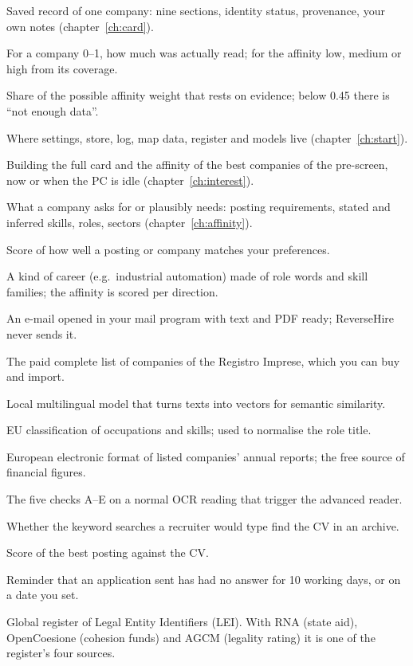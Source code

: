\begin{description}[style=unboxed, leftmargin=1.2em, itemsep=2pt, font=\normalfont\bfseries\color{othDark}]
\item[Company card] Saved record of one company: nine sections, identity status, provenance, your own notes (chapter~\ref{ch:card}).
\item[Confidence] For a company 0--1, how much was actually read; for the affinity low, medium or high from its coverage.
\item[Coverage] Share of the possible affinity weight that rests on evidence; below 0.45 there is ``not enough data''.
\item[Data folder] Where settings, store, log, map data, register and models live (chapter~\ref{ch:start}).
\item[Deep analysis] Building the full card and the affinity of the best companies of the pre-screen, now or when the PC is idle (chapter~\ref{ch:interest}).
\item[Demand] What a company asks for or plausibly needs: posting requirements, stated and inferred skills, roles, sectors (chapter~\ref{ch:affinity}).
\item[Desirability] Score of how well a posting or company matches your preferences.
\item[Direction] A kind of career (e.g.\ industrial automation) made of role words and skill families; the affinity is scored per direction.
\item[Draft] An e-mail opened in your mail program with text and PDF ready; ReverseHire never sends it.
\item[Elenco] The paid complete list of companies of the Registro Imprese, which you can buy and import.
\item[Embedding model] Local multilingual model that turns texts into vectors for semantic similarity.
\item[ESCO] EU classification of occupations and skills; used to normalise the role title.
\item[ESEF] European electronic format of listed companies' annual reports; the free source of financial figures.
\item[Failure signals] The five checks A--E on a normal OCR reading that trigger the advanced reader.
\item[Findability] Whether the keyword searches a recruiter would type find the CV in an archive.
\item[Fit] Score of the best posting against the CV.
\item[Follow-up] Reminder that an application sent has had no answer for 10 working days, or on a date you set.
\item[GLEIF] Global register of Legal Entity Identifiers (LEI). With RNA (state aid), OpenCoesione (cohesion funds) and AGCM (legality rating) it is one of the register's four sources.

\end{description}
